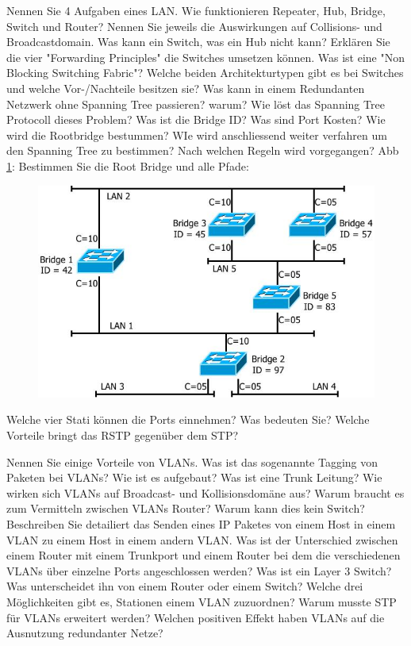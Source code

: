 \documentclass[ngerman,a4paper,12pt]{scrreprt}
\begin{document}
\olR
	\li Nennen Sie 4 Aufgaben eines LAN.
	\li Wie funktionieren Repeater, Hub, Bridge, Switch und Router? Nennen Sie jeweils die Auswirkungen auf Collisions- und Broadcastdomain.
	\li Was kann ein Switch, was ein Hub nicht kann?
	\li Erklären Sie die vier "Forwarding Principles" die Switches umsetzen können.
	\li Was ist eine "Non Blocking Switching Fabric"?
	\li Welche beiden Architekturtypen gibt es bei Switches und welche Vor-/Nachteile besitzen sie?
\olS
{}
\olR
	\li Was kann in einem Redundanten Netzwerk ohne Spanning Tree passieren? warum? Wie löst das Spanning Tree Protocoll dieses Problem?
	\li Was ist die Bridge ID? Was sind Port Kosten?
	\li Wie wird die Rootbridge bestummen? WIe wird anschliessend weiter verfahren um den Spanning Tree zu bestimmen? Nach welchen Regeln wird vorgegangen?
	\li Abb \ref{stpex1}: Bestimmen Sie die Root Bridge und alle Pfade:
	\begin{figure}[H]
		\centering
		\includegraphics[scale=0.60]{img/R4.1.jpg}
		\caption{}
		\label{stpex1}
	\end{figure}
	\li Welche vier Stati können die Ports einnehmen? Was bedeuten Sie?
	\li Welche Vorteile bringt das RSTP gegenüber dem STP?
\olS


\olR
	\li Nennen Sie einige Vorteile von VLANs.
	\li Was ist das sogenannte Tagging von Paketen bei VLANs? Wie ist es aufgebaut?
	\li Was ist eine Trunk Leitung?
	\li Wie wirken sich VLANs auf Broadcast- und Kollisionsdomäne aus?
	\li Warum braucht es zum Vermitteln zwischen VLANs Router? Warum kann dies kein Switch?
	\li Beschreiben Sie detailiert das Senden eines IP Paketes von einem Host in einem VLAN zu einem Host in einem andern VLAN.
	\li Was ist der Unterschied zwischen einem Router mit einem Trunkport und einem Router bei dem die verschiedenen VLANs über einzelne Ports angeschlossen werden?
	\li Was ist ein Layer 3 Switch? Was unterscheidet ihn von einem Router oder einem Switch?
	\li Welche drei Möglichkeiten gibt es, Stationen einem VLAN zuzuordnen?
	\li  Warum musste STP für VLANs erweitert werden? Welchen positiven Effekt haben VLANs auf die Ausnutzung redundanter Netze?
\olS
\end{document}
